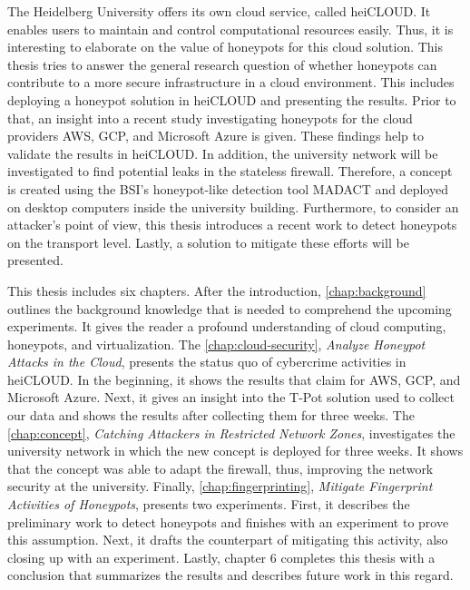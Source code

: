 The Heidelberg University offers its own cloud service, called heiCLOUD.
It enables users to maintain and control computational resources easily. 
Thus, it is interesting to elaborate on the value of honeypots for this cloud solution.
This thesis tries to answer the general research question of whether honeypots can contribute to a more secure infrastructure in a cloud environment.
This includes deploying a honeypot solution in heiCLOUD and presenting the results.
Prior to that, an insight into a recent study investigating honeypots for the cloud providers AWS, GCP, and Microsoft Azure is given.
These findings help to validate the results in heiCLOUD.
In addition, the university network will be investigated to find potential leaks in the stateless firewall.
Therefore, a concept is created using the BSI's honeypot-like detection tool MADACT and deployed on desktop computers inside the university building.
Furthermore, to consider an attacker's point of view, this thesis introduces a recent work to detect honeypots on the transport level.
Lastly, a solution to mitigate these efforts will be presented.

This thesis includes six chapters.
After the introduction, \autoref{chap:background} outlines the background knowledge that is needed to comprehend the upcoming experiments.
It gives the reader a profound understanding of cloud computing, honeypots, and virtualization.
The \autoref{chap:cloud-security}, \textit{Analyze Honeypot Attacks in the Cloud}, presents the status quo of cybercrime activities in heiCLOUD.
In the beginning, it shows the results that \citet{Kelly2021} claim for AWS, GCP, and Microsoft Azure.
Next, it gives an insight into the T-Pot solution used to collect our data and shows the results after collecting them for three weeks.
The \autoref{chap:concept}, \textit{Catching Attackers in Restricted Network Zones}, investigates the university network in which the new concept is deployed for three weeks.
It shows that the concept was able to adapt the firewall, thus, improving the network security at the university.
Finally, \autoref{chap:fingerprinting}, \textit{Mitigate Fingerprint Activities of Honeypots}, presents two experiments.
First, it describes the preliminary work to detect honeypots and finishes with an experiment to prove this assumption.
Next, it drafts the counterpart of mitigating this activity, also closing up with an experiment.
Lastly, chapter 6 completes this thesis with a conclusion that summarizes the results and describes future work in this regard.
